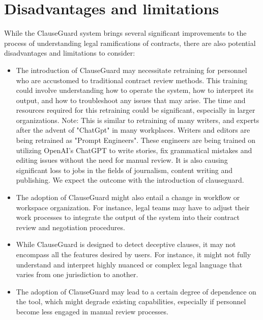 \section{Disadvantages and limitations \label{Section::Disadvantages and Limitations}}
While the ClauseGuard system brings several significant improvements to the process of understanding legal ramifications of contracts, there are also potential disadvantages and limitations to consider: 
\begin{itemize}
    \item The introduction of ClauseGuard may necessitate retraining for personnel who are accustomed to traditional contract review methods. This training could involve understanding how to operate the system, how to interpret its output, and how to troubleshoot any issues that may arise. The time and resources required for this retraining could be significant, especially in larger organizations. 
    Note: This is similar to retraining of many writers, and experts after the advent of "ChatGpt" in many workplaces. Writers and editors are being retrained as "Prompt Engineers". These engineers are being trained on utilizing OpenAI's ChatGPT to write stories, fix grammatical mistakes and editing issues without the need for manual review. It is also causing significant loss to jobs in the fields of journalism, content writing and publishing. We expect the outcome with the introduction of clauseguard.
    \item The adoption of ClauseGuard might also entail a change in workflow or workspace organization. For instance, legal teams may have to adjust their work processes to integrate the output of the system into their contract review and negotiation procedures.
    \item While ClauseGuard is designed to detect deceptive clauses, it may not encompass all the features desired by users. For instance, it might not fully understand and interpret highly nuanced or complex legal language that varies from one jurisdiction to another.
    \item The adoption of ClauseGuard may lead to a certain degree of dependence on the tool, which might degrade existing capabilities, especially if personnel become less engaged in manual review processes.








\end{itemize}




